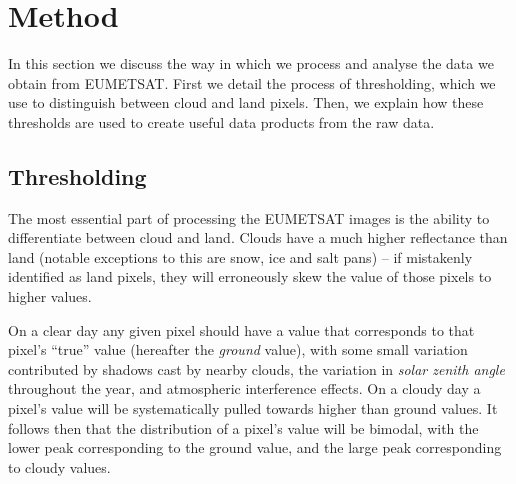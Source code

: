 \section{Method}
In this section we discuss the way in which we process and analyse the data we
obtain from EUMETSAT. First we detail the process of thresholding, which we use
to distinguish between cloud and land pixels. Then, we explain how these
thresholds are used to create useful data products from the raw data.

\subsection{Thresholding}
The most essential part of processing the EUMETSAT images is the ability to
differentiate between cloud and land. Clouds have a much higher reflectance than
land (notable exceptions to this are snow, ice and salt pans) -- if mistakenly
identified as land pixels, they will erroneously skew the value of those pixels
to higher values.

On a clear day any given pixel should have a value that corresponds to that
pixel's ``true'' value (hereafter the \emph{ground} value), with some small
variation contributed by shadows cast by nearby clouds, the variation in
\emph{solar zenith angle} throughout the year, and atmospheric interference
effects. On a cloudy day a pixel's value will be systematically pulled towards
higher than ground values. It follows then that the distribution of a pixel's
value will be bimodal, with the lower peak corresponding to the ground value,
and the large peak corresponding to cloudy values.

